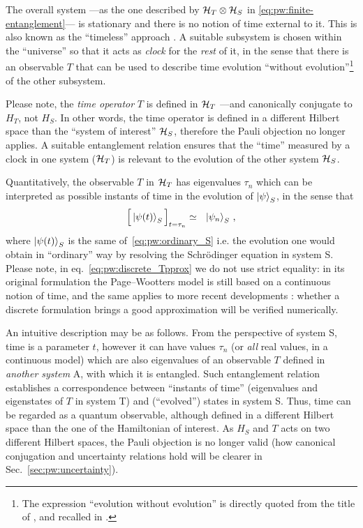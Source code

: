 The overall system
---as the one described by $\mathcal{H}_T \otimes \mathcal{H}_S$ in \eqref{eq:pw:finite-entanglement}---
is stationary and there is no notion
of time external to it.
This is also known as the
``timeless'' approach \parencite{Marletto:Evolution}.
\citereset
A suitable subsystem is chosen within the ``universe'' so that it acts as
\emph{clock} for the \emph{rest} of it, in the sense that
there is an observable $T$
that can be used to
describe time evolution ``without evolution''\footnote{
  The expression ``evolution without evolution''
  is directly quoted from the title of \cite{PageWootters},
  and recalled in \cite{Marletto:Evolution}.
}
of the other subsystem.

Please note,
the \emph{time operator} $T$ is defined in $\mathcal{H}_T$ ---and canonically conjugate to $H_T$, not $H_S$.
In other words, the time operator is defined in a different Hilbert space than the ``system of interest'' $\mathcal{H}_S$,
therefore
the Pauli objection no longer applies. A suitable entanglement relation ensures that 
the ``time'' measured by a clock in one system ($\mathcal{H}_T$) is relevant to the evolution of the other
system $\mathcal{H}_S$.

Quantitatively,
the observable $T$ in $\mathcal{H}_T$
has eigenvalues $\tau_n$ which can be interpreted as possible
instants of time in the evolution of $\ket{\psi}_S$, in the sense that
\begin{equation}\label{eq:pw:discrete_Tpprox}
  \Big[ \ket{\psi(t)}_S \Big]_{t=\tau_n} \simeq \,\,\,\, \ket{\psi_n}_S \, \text{,}
\end{equation}
where $\ket{\psi(t)}_S$ is the same of~\eqref{eq:pw:ordinary_S} i.e.
the evolution one would obtain in ``ordinary'' way
by resolving the Schr\"{o}dinger equation in system S.
Please note, in eq.~\eqref{eq:pw:discrete_Tpprox} we do not use strict equality:
in its original formulation the Page--Wootters model is still based on a continuous
notion of time, and the same applies to more recent developments \parencite{Lloyd:Time}:
whether a discrete formulation
brings a good approximation
will be verified numerically.

An intuitive description may be as follows.
From the perspective of system S, time is a parameter $t$, however it can have values
$\tau_n$ (or \emph{all} real values, in a continuous model)
which are also eigenvalues of an observable $T$ defined in \emph{another system} A,
with which it is entangled. Such entanglement relation establishes a correspondence
between ``instants of time'' (eigenvalues and eigenstates of $T$ in system T)
and (``evolved'') states in system S. Thus, time can be regarded as a quantum observable,
although defined in a different Hilbert space than the one of the Hamiltonian of interest.
As $H_S$ and $T$ acts on two different Hilbert spaces, the Pauli objection is no longer valid
(how canonical conjugation and uncertainty relations hold will be clearer in Sec.~\ref{sec:pw:uncertainty}).

